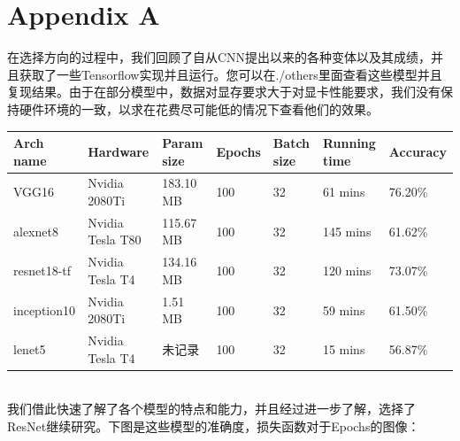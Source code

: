 \documentclass[hyperref, UTF8, 12pt]{article}
\theoremstyle{definition}
\begin{document}
\section{Appendix A}
在选择方向的过程中，我们回顾了自从CNN提出以来的各种变体以及其成绩，并且获取了一些Tensorflow实现并且运行。您可以在./others里面查看这些模型并且复现结果。由于在部分模型中，数据对显存要求大于对显卡性能要求，我们没有保持硬件环境的一致，以求在花费尽可能低的情况下查看他们的效果。
\begin{table}[h]
	\begin{tabular}{|l|l|l|l|l|l|l|}
		\hline
		Arch name   & Hardware            & Param size & Epochs & Batch size & Running time & Accuracy \\ \hline
		VGG16       & Nvidia 2080Ti       & 183.10 MB  & 100    & 32         & 61 mins      & 76.20\%  \\ \hline
		alexnet8    & Nvidia Tesla T80    & 115.67 MB  & 100    & 32         & 145 mins     & 61.62\%  \\ \hline
		resnet18-tf & Nvidia Tesla T4     & 134.16 MB  & 100    & 32         & 120 mins     & 73.07\%    \\ \hline
		inception10 & Nvidia 2080Ti       & 1.51 MB    & 100    & 32         & 59 mins      &  61.50\%    \\ \hline
		lenet5 		& Nvidia Tesla T4     & 未记录      & 100    & 32         & 15 mins      &  56.87\%    \\ \hline
	\end{tabular}
\end{table}
\\
\indent
我们借此快速了解了各个模型的特点和能力，并且经过进一步了解，选择了ResNet继续研究。下图是这些模型的准确度，损失函数对于Epochs的图像：
\end{document}
